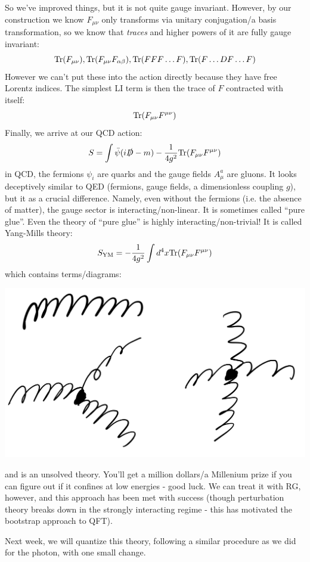 So we've improved things, but it is not quite gauge invariant. However, by our construction we know $F_{\mu\nu}$ only transforms via unitary conjugation/a basis transformation, so we know that \emph{traces} and higher powers of it are fully gauge invariant:
\begin{equation}
    \mathrm{Tr}(F_{\mu\nu}), \mathrm{Tr}(F_{\mu\nu}F_{\alpha\beta}), \mathrm{Tr}(FFF\ldots F), \mathrm{Tr}(F\ldots DF\ldots F)
\end{equation}
However we can't put these into the action directly because they have free Lorentz indices. The simplest LI term is then the trace of $F$ contracted with itself:
\begin{equation}
    \mathrm{Tr}(F_{\mu\nu}F^{\mu\nu})
\end{equation}
Finally, we arrive at our QCD action:
\begin{equation}
    S = \int \bar{\psi}(i\slashed{D} - m) - \frac{1}{4g^2}\mathrm{Tr}(F_{\mu\nu}F^{\mu\nu})
\end{equation}
in QCD, the fermions $\psi_i$ are quarks and the gauge fields $A_\mu^a$ are gluons. It looks deceptively similar to QED (fermions, gauge fields, a dimensionless coupling $g$), but it as a crucial difference. Namely, even without the fermions (i.e. the absence of matter), the gauge sector is interacting/non-linear. It is sometimes called ``pure glue''. Even the theory of ``pure glue'' is highly interacting/non-trivial! It is called Yang-Mills theory:
\begin{equation}
    S_{\text{YM}} = -\frac{1}{4g^2}\int d^4x \mathrm{Tr}(F_{\mu\nu}F^{\mu\nu})
\end{equation}
which contains terms/diagrams:

\begin{center}
    \includegraphics[scale=0.35]{Lectures/Images/lec16-gluons.png}
\end{center}

and is an unsolved theory. You'll get a million dollars/a Millenium prize if you can figure out if it confines at low energies - good luck. We can treat it with RG, however, and this approach has been met with success (though perturbation theory breaks down in the strongly interacting regime - this has motivated the bootstrap approach to QFT).

Next week, we will quantize this theory, following a similar procedure as we did for the photon, with one small change.